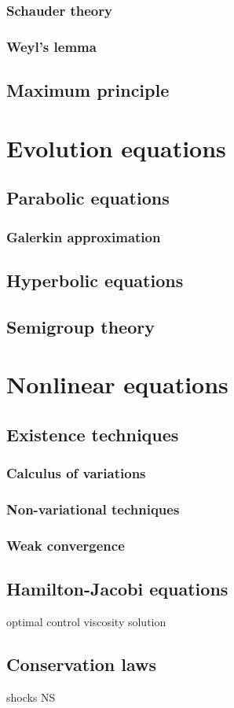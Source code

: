 \documentclass{../note}
\begin{document}
\section{Schauder theory}
\section{Weyl's lemma}

\chapter{Maximum principle}











\part{Evolution equations}

\chapter{Parabolic equations}
\section{Galerkin approximation}

\chapter{Hyperbolic equations}

\chapter{Semigroup theory}



\part{Nonlinear equations}

\chapter{Existence techniques}
\section{Calculus of variations}
\section{Non-variational techniques}
\section{Weak convergence}

\chapter{Hamilton-Jacobi equations}
optimal control
viscosity solution

\chapter{Conservation laws}
shocks
NS
\end{document}
